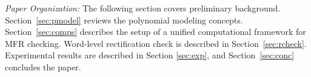 
{\it Paper Organization:} The following section covers preliminary
background. Section~\ref{sec:pmodel} reviews the polynomial modeling concepts.
Section~\ref{sec:comps} describes the setup of a unified computational
framework for MFR checking. Word-level rectification check is described in
Section~\ref{sec:rcheck}.
Experimental results are described in Section \ref{sec:exp}, and
Section~\ref{sec:conc} concludes the paper. 